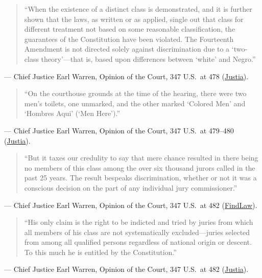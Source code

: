 \documentclass[12pt]{article}
\begin{document}
\begin{quote}
``When the existence of a distinct class is demonstrated, and it is further shown that the laws, as written or as applied, single out that class for different treatment not based on some reasonable classification, the guarantees of the Constitution have been violated. The Fourteenth Amendment is not directed solely against discrimination due to a `two-class theory'---that is, based upon differences between `white' and Negro.''
\end{quote}
\noindent --- Chief Justice Earl Warren, Opinion of the Court, 347 U.S.\ at 478 (\href{https://supreme.justia.com/cases/federal/us/347/475/}{Justia}).

\begin{quote}
``On the courthouse grounds at the time of the hearing, there were two men's toilets, one unmarked, and the other marked `Colored Men' and `Hombres Aqui' (`Men Here').''
\end{quote}
\noindent --- Chief Justice Earl Warren, Opinion of the Court, 347 U.S.\ at 479--480 (\href{https://supreme.justia.com/cases/federal/us/347/475/}{Justia}).

\begin{quote}
``But it taxes our credulity to say that mere chance resulted in there being no members of this class among the over six thousand jurors called in the past 25 years. The result bespeaks discrimination, whether or not it was a conscious decision on the part of any individual jury commissioner.''
\end{quote}
\noindent --- Chief Justice Earl Warren, Opinion of the Court, 347 U.S.\ at 482 (\href{https://caselaw.findlaw.com/court/us-supreme-court/347/475.html}{FindLaw}).

\begin{quote}
``His only claim is the right to be indicted and tried by juries from which all members of his class are not systematically excluded---juries selected from among all qualified persons regardless of national origin or descent. To this much he is entitled by the Constitution.''
\end{quote}
\noindent --- Chief Justice Earl Warren, Opinion of the Court, 347 U.S.\ at 482 (\href{https://supreme.justia.com/cases/federal/us/347/475/}{Justia}).
\end{document}
